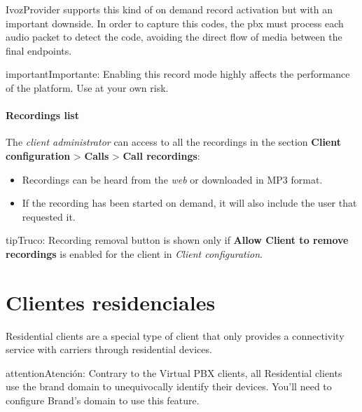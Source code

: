 \documentclass[letterpaper,10pt,spanish]{sphinxmanual}
\begin{document}
IvozProvider supports this kind of on demand record activation but with an
important downside. In order to capture this codes, the pbx must process each
audio packet to detect the code, avoiding the direct flow of media between the
final endpoints.

\begin{notice}{important}{Importante:}
Enabling this record mode highly affects the performance of the
platform. Use at your own risk.
\end{notice}


\paragraph{Recordings list}
\label{administration_portal/client/vpbx/calls/call_recordings:recordings-list}
The \emph{client administrator} can access to all the recordings in the section
\textbf{Client configuration} \textgreater{} \textbf{Calls} \textgreater{} \textbf{Call recordings}:
\begin{itemize}
\item {} 
Recordings can be heard from the \emph{web} or downloaded in MP3 format.

\item {} 
If the recording has been started on demand, it will also include the user
that requested it.

\end{itemize}

\begin{notice}{tip}{Truco:}
Recording removal button is shown only if \textbf{Allow Client to remove recordings} is enabled
for the client in \emph{Client configuration}.
\end{notice}
\label{administration_portal/client/residential/index:residential-clients}

\section{Clientes residenciales}
\label{administration_portal/client/residential/index:residential-clients}\label{administration_portal/client/residential/index:id1}\label{administration_portal/client/residential/index::doc}\label{administration_portal/client/residential/index:clientes-residenciales}
Residential clients are a special type of client that only provides a connectivity
service with carriers through residential devices.

\begin{notice}{attention}{Atención:}
Contrary to the Virtual PBX clients, all Residential clients use the
brand domain to unequivocally identify their devices. You'll need to configure
Brand's domain to use this feature.
\end{notice}
\end{document}
